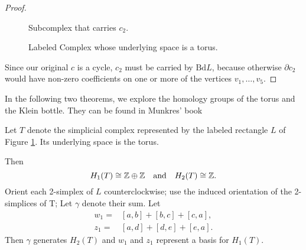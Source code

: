 \begin{proof}
\begin{figure}
\begin{center}
\parbox{\linewidth}{
		\parbox[t]{.48\linewidth}{\caption{Subcomplex that carries $c_2$.\label{skelleton}}}%
		\parbox[t]{.48\linewidth}{\caption{Labeled Complex whose underlying space is a torus.\label{torus-tri}}}}
	\end{center}
\end{figure} 

Since our original $c$ is a cycle, $c_2$ must be carried by $\mathrm{Bd} L$, because otherwise $\partial c_2$ 
would have non-zero coefficients on one or more of the vertices $v_1, \dots,v_5$.
\end{proof}


In the following two theorems, we explore the homology groups of the torus and the Klein bottle. They can be found in Munkres' book \parencite[p. 35f]{mu}
\begin{theorem}
	Let $T$ denote the simplicial complex represented by the labeled rectangle $L$ of Figure \ref{torus-tri}. Its underlying space is the torus.
	
	 Then
	\[H_1(T)\cong \mathbb{Z}\oplus\mathbb{Z} \quad \text{and} \quad H_2(T)\cong \mathbb{Z}.\]
	Orient each 2-simplex of $L$ counterclockwise; use the induced orientation of the 2-simplices of T; Let $\gamma$ denote their sum. Let 
	\begin{align*}
	w_1=&[a,b]+[b,c]+[c,a],\\
	z_1=&[a,d]+[d,e]+[e,a].
	\end{align*}
	Then $\gamma$ generates $H_2(T)$ and $w_1$ and $z_1$ represent a basis for $H_1(T)$.
\end{theorem}


